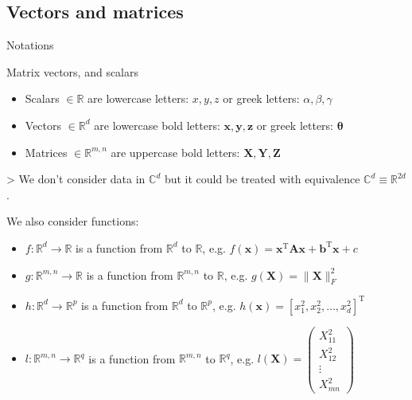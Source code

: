 \documentclass[aspectratio=1610]{beamer}
\begin{document}
\subsection{Vectors and matrices}

\begin{frame}{Notations}
  \begin{block}{Matrix vectors, and scalars}
    \begin{itemize}
      \item Scalars $\in\mathbb{R}$ are lowercase letters: $x,y,z$ or greek letters: $\alpha, \beta, \gamma$
      \item Vectors $\in\mathbb{R}^d$ are lowercase bold letters: $\mathbf{x}, \mathbf{y}, \mathbf{z}$ or greek letters: $\boldsymbol{\theta}$
      \item Matrices $\in\mathbb{R}^{m,n}$ are uppercase bold letters: $\mathbf{X}, \mathbf{Y}, \mathbf{Z}$ 
    \end{itemize}
    > We don't consider data in $\mathbb{C}^d$ but it could be treated with equivalence $\mathbb{C}^d \equiv \mathbb{R}^{2d}$.
  \end{block}
  
  We also consider functions:
  {\footnotesize
  \begin{itemize}
    \item $f:\mathbb{R}^d\to\mathbb{R}$ is a function from $\mathbb{R}^d$ to $\mathbb{R}$, e.g. $f(\mathbf{x}) = \mathbf{x}^\mathrm{T}\mathbf{A}\mathbf{x} + \mathbf{b}^\mathrm{T}\mathbf{x} + c$
    \item $g:\mathbb{R}^{m,n}\to\mathbb{R}$ is a function from $\mathbb{R}^{m,n}$ to $\mathbb{R}$, e.g. $g(\mathbf{X}) = \|\mathbf{X}\|_F^2$
    \item $h:\mathbb{R}^d\to\mathbb{R}^p$ is a function from $\mathbb{R}^d$ to $\mathbb{R}^p$, e.g. $h(\mathbf{x}) = [x_1^2, x_2^2, \ldots, x_d^2]^\mathrm{T}$
    \item $l:\mathbb{R}^{m,n}\to\mathbb{R}^q$ is a function from $\mathbb{R}^{m,n}$ to $\mathbb{R}^q$, e.g. $l(\mathbf{X}) = \begin{pmatrix} X_{11}^2 \\ X_{12}^2 \\ \vdots \\ X_{mn}^2 \end{pmatrix}$
  \end{itemize}
  }
\end{frame}
\end{document}
